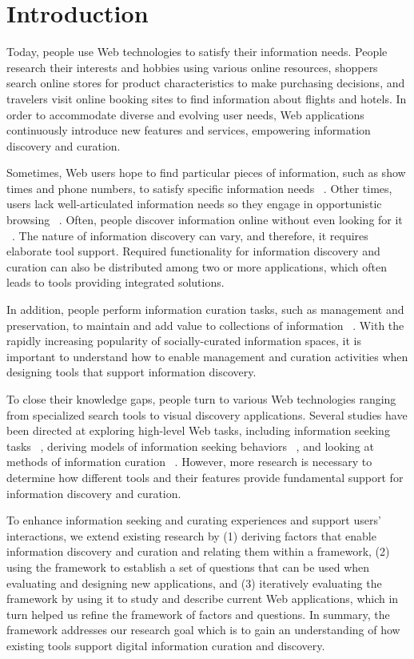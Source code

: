 \documentclass{casconpaper}
\begin{document}
{\section{Introduction}
Today, people use Web technologies to satisfy their information needs. People research their interests and hobbies using various online resources, shoppers search online stores for product characteristics to make purchasing decisions, and travelers visit online booking sites to find information about flights and hotels. In order to accommodate diverse and evolving user needs, Web applications continuously introduce new features and services, empowering information discovery and curation.  

Sometimes, Web users hope to find particular pieces of information, such as show times and phone numbers, to satisfy specific information needs ~\cite{proper}. Other times, users lack well-articulated information needs so they engage in opportunistic browsing ~\cite{lindley}. Often, people discover information online without even looking for it ~\cite{bates1986}. The nature of information discovery can vary, and therefore, it requires elaborate tool support. Required functionality for information discovery and curation can also be distributed among two or more applications, which often leads to tools providing integrated solutions.

In addition, people perform information curation tasks, such as management and preservation, to maintain and add value to collections of information ~\cite{beagrie}. With the rapidly increasing popularity of socially-curated information spaces, it is important to understand how to enable management and curation activities when designing tools that support information discovery.

To close their knowledge gaps, people turn to various Web technologies ranging from specialized search tools to visual discovery applications. Several studies have been directed at exploring high-level Web tasks, including information seeking tasks ~\cite{kellar2006, kellar2007, morrison, sellen}, deriving models of information seeking behaviors ~\cite{choo, ellis1989, ellis1993, ellis1997, bates1986, bates2002}, and looking at methods of information curation ~\cite{beagrie, wittaker}. However, more research is necessary to determine how different tools and their features provide fundamental support for information discovery and curation.

To enhance information seeking and curating experiences and support users' interactions, we extend existing research by (1) deriving factors that enable information discovery and curation and relating them within a framework, (2) using the framework to establish a set of questions that can be used when evaluating and designing new applications, and (3) iteratively evaluating the framework by using it to study and describe current Web applications, which in turn helped us refine the framework of factors and questions. In summary, the framework addresses our research goal which is to gain an understanding of how existing tools support digital information curation and discovery. 

}
\end{document}
